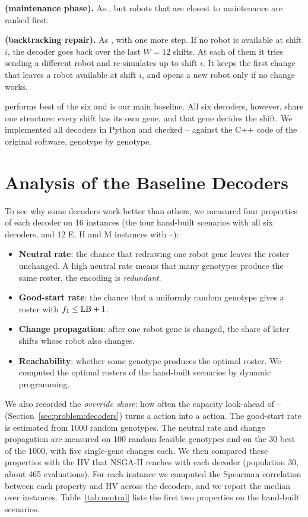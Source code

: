 \documentclass[journal]{IEEEtran}
\begin{document}
\textbf{ (maintenance phase).}
As , but robots that are closest to maintenance are ranked first.

\textbf{ (backtracking repair).}
As , with one more step.
If no robot is available at shift $i$, the decoder goes back over the last $W = 12$ shifts.
At each of them it tries sending a different robot and re-simulates up to shift $i$.
It keeps the first change that leaves a robot available at shift $i$, and opens a new robot only if no change works.

 performs best of the six and is our main baseline.
All six decoders, however, share one structure: every shift has its own gene, and that gene decides the shift.
We implemented all decoders in Python and checked -- against the C++ code of the original software, genotype by genotype.



\section{Analysis of the Baseline Decoders}
\label{sec:s-motivation}


To see why some decoders work better than others, we measured four properties of each decoder on 16 instances
(the four hand-built scenarios with all six decoders, and 12 E, H and M instances with --):
\begin{itemize}
  \item \textbf{Neutral rate}: the chance that redrawing one robot gene leaves the roster unchanged.
  A high neutral rate means that many genotypes produce the same roster, \ie the encoding is \emph{redundant}.
  \item \textbf{Good-start rate}: the chance that a uniformly random genotype gives a roster with $f_{1} \le \mathrm{LB} + 1$.
  \item \textbf{Change propagation}: after one robot gene is changed, the share of later shifts whose robot also changes.
  \item \textbf{Reachability}: whether some genotype produces the optimal roster. We computed the optimal rosters of the hand-built scenarios by dynamic programming.
\end{itemize}
We also recorded the \emph{override share}: how often the capacity look-ahead of -- (Section~\ref{sec:problem:decoders}) turns a \new action into a \reuse action.
The good-start rate is estimated from 1000 random genotypes.
The neutral rate and change propagation are measured on 100 random feasible genotypes and on the 30 best of the 1000, with five single-gene changes each.
We then compared these properties with the HV that NSGA-II \cite{deb2002nsga2} reaches with each decoder
(population 30, about 465 evaluations).
For each instance we computed the Spearman correlation between each property and HV across the decoders, and we report the median over instances.
Table~\ref{tab:neutral} lists the first two properties on the hand-built scenarios.
\end{document}
